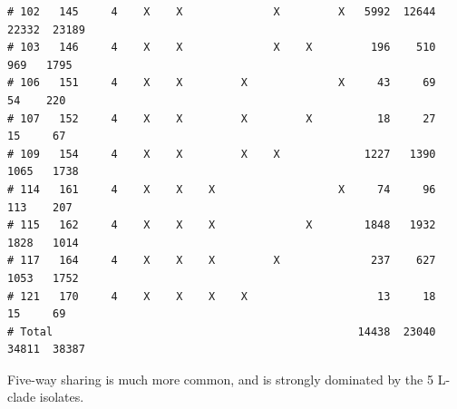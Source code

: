 \documentclass{article}\usepackage[]{graphicx}\usepackage[]{color}
\makeatletter
\newenvironment{kframe}{%
 \def\at@end@of@kframe{}%
 \ifinner\ifhmode%
  \def\at@end@of@kframe{\end{minipage}}%
  \begin{minipage}{\columnwidth}%
 \fi\fi%
 \def\FrameCommand##1{\hskip\@totalleftmargin \hskip-\fboxsep
 \colorbox{shadecolor}{##1}\hskip-\fboxsep
     \hskip-\linewidth \hskip-\@totalleftmargin \hskip\columnwidth}%
 \MakeFramed {\advance\hsize-\width
   \@totalleftmargin\z@ \linewidth\hsize
   \@setminipage}}%
 {\par\unskip\endMakeFramed%
 \at@end@of@kframe}
\newenvironment{knitrout}{}{} %
\makeatother
\begin{document}
\begin{knitrout}
\begin{kframe}
\begin{verbatim}
# 102   145     4    X    X              X         X   5992  12644  22332  23189
# 103   146     4    X    X              X    X         196    510    969   1795
# 106   151     4    X    X         X              X     43     69     54    220
# 107   152     4    X    X         X         X          18     27     15     67
# 109   154     4    X    X         X    X             1227   1390   1065   1738
# 114   161     4    X    X    X                   X     74     96    113    207
# 115   162     4    X    X    X              X        1848   1932   1828   1014
# 117   164     4    X    X    X         X              237    627   1053   1752
# 121   170     4    X    X    X    X                    13     18     15     69
# Total                                               14438  23040  34811  38387
\end{verbatim}
\end{kframe}
\end{knitrout}

Five-way sharing is much more common, and is strongly dominated by the 5 L-clade isolates.
\end{document}
